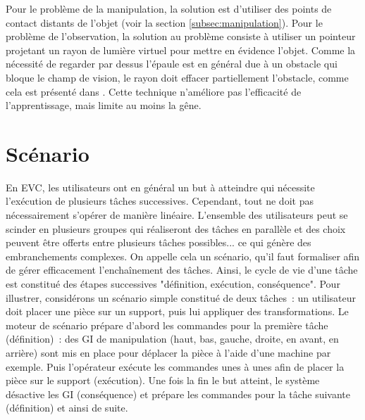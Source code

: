 \documentclass[11pt]{article}
\begin{document}
Pour le problème de la manipulation, la solution est d'utiliser des points de contact distants de l'objet (voir la section \ref{subsec:manipulation}). Pour le problème de l'observation, la solution au problème consiste à utiliser un pointeur projetant un rayon de lumière virtuel pour mettre en évidence l'objet. Comme la nécessité de regarder par dessus l'épaule est en général due à un obstacle qui bloque le champ de vision, le rayon doit effacer partiellement l'obstacle, comme cela est présenté dans \cite{show-through}. Cette technique n'améliore pas l'efficacité de l'apprentissage, mais limite au moins la gêne.

\section{Scénario}
En EVC, les utilisateurs ont en général un but à atteindre qui nécessite l'exécution de plusieurs tâches successives. Cependant, tout ne doit pas nécessairement s'opérer de manière linéaire. L'ensemble des utilisateurs peut se scinder en plusieurs groupes qui réaliseront des tâches en parallèle et des choix peuvent être offerts entre plusieurs tâches possibles... ce qui génère des embranchements complexes. On appelle cela un scénario, qu'il faut formaliser afin de gérer efficacement l'enchaînement des tâches. Ainsi, le cycle de vie d'une tâche est constitué des étapes successives "définition, exécution, conséquence". Pour illustrer, considérons un scénario simple constitué de deux tâches~: un utilisateur doit placer une pièce sur un support, puis lui appliquer des transformations. Le moteur de scénario prépare d'abord les commandes pour la première tâche (définition)~: des GI de manipulation (haut, bas, gauche, droite, en avant, en arrière) sont mis en place pour déplacer la pièce à l'aide d'une machine par exemple. Puis l'opérateur exécute les commandes unes à unes afin de placer la pièce sur le support (exécution). Une fois la fin le but atteint, le système désactive les GI (conséquence) et prépare les commandes pour la tâche suivante (définition) et ainsi de suite.
\\
\end{document}
